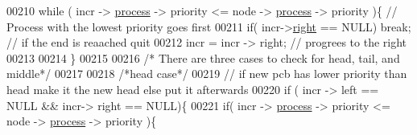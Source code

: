 \begin{DoxyCode}
{00210         \textcolor{keywordflow}{while} ( incr -> \hyperlink{structprocess}{process} -> priority <= node -> \hyperlink{structprocess}{process} -> priority  )\{ \textcolor{comment}{//
       Process with the lowest priority goes first }
00211                         \textcolor{keywordflow}{if}( incr->\hyperlink{structpage_a72bca7218659f6f6e4e94cc0bacc26d1}{right} == NULL) \textcolor{keywordflow}{break}; \textcolor{comment}{// if the end is reaached
       quit}
00212                         incr = incr -> right; \textcolor{comment}{// progrees to the right }
00213                         
00214         \}
00215         
00216         \textcolor{comment}{/* There are three cases to check for head, tail, and middle*/}
00217         
00218         \textcolor{comment}{/*head case*/}
00219         \textcolor{comment}{// if new pcb has lower priority than head make it the new head else put 
      it afterwards}
00220         \textcolor{keywordflow}{if} ( incr -> left == NULL && incr-> right == NULL)\{
00221                 \textcolor{keywordflow}{if}( incr -> \hyperlink{structprocess}{process} -> priority <= node -> \hyperlink{structprocess}{process} -> priority )\{
      
}
\end{DoxyCode}

